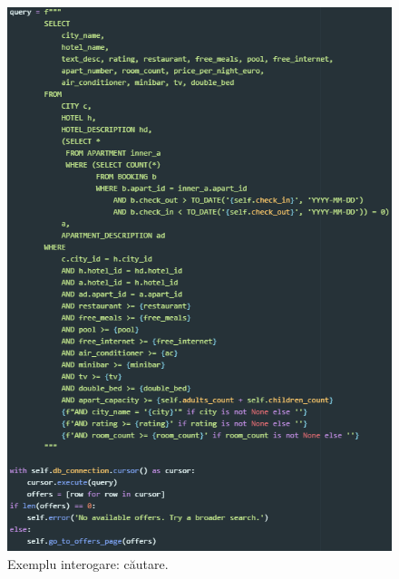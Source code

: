 \documentclass[12pt]{article}
\begin{document}
\begin{figure}[!htb]
	\centering
	\includegraphics[width=\linewidth]{SearchEx.PNG}
	\caption{Exemplu interogare: căutare.}\label{fig:fig4}
\end{figure}
\end{document}
